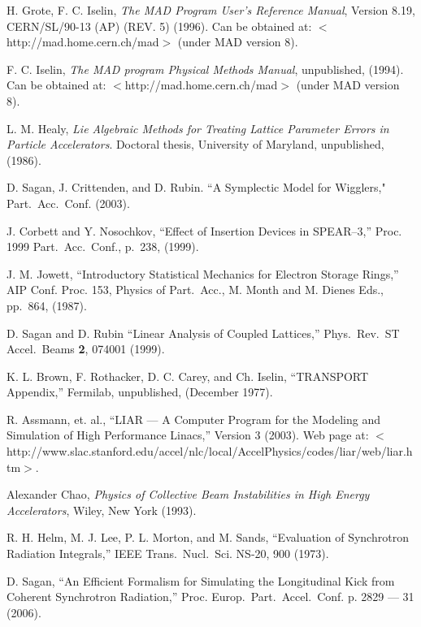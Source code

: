 \begin{thebibliography}{99}

H. Grote, F. C. Iselin, {\it The MAD Program User's Reference Manual},
Version 8.19, CERN/SL/90-13 (AP) (REV. 5) (1996). Can be obtained at:
$<$http://mad.home.cern.ch/mad$>$ (under MAD version 8).

F. C. Iselin, {\it The MAD program Physical Methods Manual}, 
unpublished, (1994).  Can be obtained at: $<$http://mad.home.cern.ch/mad$>$
(under MAD version 8).

L. M. Healy, {\it Lie Algebraic Methods for Treating Lattice Parameter
Errors in Particle Accelerators}. Doctoral thesis, University of
Maryland, unpublished, (1986).

D. Sagan, J. Crittenden, and D. Rubin.
``A Symplectic Model for Wigglers," Part.\ Acc.\ Conf. (2003).

J. Corbett and Y. Nosochkov, ``Effect of Insertion Devices in SPEAR--3,''
Proc. 1999 Part.\ Acc.\ Conf., p.~238, (1999).

J. M. Jowett, ``Introductory Statistical Mechanics
for Electron Storage Rings,'' AIP Conf. Proc. 153, Physics of Part.\ Acc.,
M. Month and M. Dienes Eds., pp.~864, (1987).

D. Sagan and D. Rubin ``Linear Analysis of Coupled Lattices,''
Phys.\ Rev.\ ST Accel.\ Beams {\bf 2}, 074001 (1999).

K. L. Brown, F. Rothacker, D. C. Carey, and Ch. Iselin, ``TRANSPORT
Appendix,'' Fermilab, unpublished, (December 1977).

R. Assmann, et. al., ``LIAR --- A Computer Program for the Modeling
and Simulation of High Performance Linacs,'' Version 3 (2003). Web page
at: \hfill\break\hspace*{0.2in}
$<$http://www.slac.stanford.edu/accel/nlc/local/AccelPhysics/codes/liar/web/liar.htm$>$.

 Alexander Chao, {\em Physics of Collective Beam
Instabilities in High Energy Accelerators}, Wiley, New York (1993). 

R. H. Helm, M. J. Lee, P. L. Morton, and M. Sands, ``Evaluation of Synchrotron
Radiation Integrals,'' IEEE Trans.~Nucl.~Sci. NS-20, 900 (1973).

D. Sagan, ``An Efficient Formalism for Simulating the Longitudinal Kick from Coherent Synchrotron Radiation,'' Proc. Europ.\ Part.\ Accel.\ Conf. p. 2829 --- 31 (2006).


\end{thebibliography}
